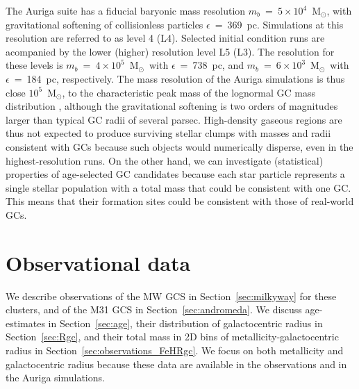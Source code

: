 \documentclass[a4paper,fleqn,usenatbib]{mnras}
\newcommand{\Sun}[0]{\ensuremath{_{\odot}}}
\begin{document}
The Auriga suite has a fiducial baryonic mass resolution $m_b$~=~$5 \times 10^4$~M\Sun,
with gravitational softening of collisionless particles $\epsilon$~=~369~pc.
Simulations at this resolution are referred to as level 4 (L4). Selected
initial condition runs are acompanied by the lower (higher) resolution level L5 (L3).
The resolution for these levels is $m_b$~=~$4 \times 10^5$~M\Sun \, with 
$\epsilon$~=~738~pc, and $m_b$~=~$6 \times 10^3$~M\Sun \, with $\epsilon$~=~184~pc,
respectively. The mass resolution of the Auriga simulations is thus close $10^{5}$~M\Sun,
to the characteristic peak mass of the lognormal GC mass distribution 
\citep{1991ARA&A..29..543H}, although the gravitational softening is two orders 
of magnitudes larger than typical GC radii of several parsec. High-density gaseous 
regions are thus not expected to produce surviving stellar clumps with masses and 
radii consistent with GCs because such objects would numerically disperse, even 
in the highest-resolution runs. On the other hand, we can investigate (statistical) 
properties of age-selected GC candidates because each star particle represents a
single stellar population with a total mass that could be consistent with one GC. 
This means that their formation sites could be consistent with those of real-world GCs.

\section{Observational data}
\label{sec:observations}
We describe observations of the MW GCS in Section~\ref{sec:milkyway} for these clusters,
and of the M31 GCS in Section~\ref{sec:andromeda}. We discuss age-estimates
in Section~\ref{sec:age}, their distribution of galactocentric radius in 
Section~\ref{sec:Rgc}, and their total mass in 2D bins of metallicity-galactocentric
radius in Section~\ref{sec:observations_FeHRgc}. We focus on both metallicity and
galactocentric radius because these data are available in the observations and
in the Auriga simulations.
\end{document}
